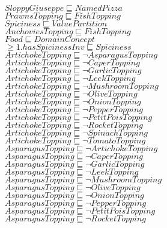 \documentclass[a4paper,10pt]{article}
\begin{document}
 $SloppyGiuseppe \sqsubseteq NamedPizza$\\ 
 $PrawnsTopping \sqsubseteq FishTopping$\\ 
 $Spiciness \sqsubseteq ValuePartition$\\ 
 $AnchoviesTopping \sqsubseteq FishTopping$\\ 
 $Food \sqsubseteq DomainConcept$\\ 
 $ \ge 1.hasSpicinessInv \sqsubseteq Spiciness$\\ 
 $ArtichokeTopping \sqsubseteq  \lnot AsparagusTopping$\\ 
 $ArtichokeTopping \sqsubseteq  \lnot CaperTopping$\\ 
 $ArtichokeTopping \sqsubseteq  \lnot GarlicTopping$\\ 
 $ArtichokeTopping \sqsubseteq  \lnot LeekTopping$\\ 
 $ArtichokeTopping \sqsubseteq  \lnot MushroomTopping$\\ 
 $ArtichokeTopping \sqsubseteq  \lnot OliveTopping$\\ 
 $ArtichokeTopping \sqsubseteq  \lnot OnionTopping$\\ 
 $ArtichokeTopping \sqsubseteq  \lnot PepperTopping$\\ 
 $ArtichokeTopping \sqsubseteq  \lnot PetitPoisTopping$\\ 
 $ArtichokeTopping \sqsubseteq  \lnot RocketTopping$\\ 
 $ArtichokeTopping \sqsubseteq  \lnot SpinachTopping$\\ 
 $ArtichokeTopping \sqsubseteq  \lnot TomatoTopping$\\ 
 $AsparagusTopping \sqsubseteq  \lnot ArtichokeTopping$\\ 
 $AsparagusTopping \sqsubseteq  \lnot CaperTopping$\\ 
 $AsparagusTopping \sqsubseteq  \lnot GarlicTopping$\\ 
 $AsparagusTopping \sqsubseteq  \lnot LeekTopping$\\ 
 $AsparagusTopping \sqsubseteq  \lnot MushroomTopping$\\ 
 $AsparagusTopping \sqsubseteq  \lnot OliveTopping$\\ 
 $AsparagusTopping \sqsubseteq  \lnot OnionTopping$\\ 
 $AsparagusTopping \sqsubseteq  \lnot PepperTopping$\\ 
 $AsparagusTopping \sqsubseteq  \lnot PetitPoisTopping$\\ 
 $AsparagusTopping \sqsubseteq  \lnot RocketTopping$\\ 
\end{document}
